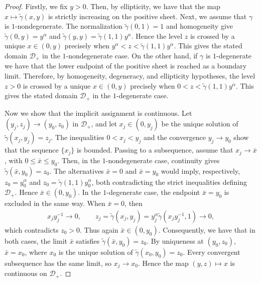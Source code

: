 \documentclass{amsart}
\theoremstyle{plain}
\theoremstyle{mainintrothm}
\theoremstyle{definition}
\begin{document}
\begin{proof}
Firstly, we	fix $y>0$. Then,  by ellipticity, we have that the map $x\mapsto\widetilde\gamma(x,y)$ is strictly increasing on the positive sheet. Next, we assume that $\gamma$ is $1$-nondegenerate.  The normalization
	$\widetilde\gamma(0,1)=1$ and homogeneity give
	$\widetilde\gamma(0,y)=y^\alpha$ and
	$\widetilde\gamma(y,y)=\widetilde\gamma(1,1)y^\alpha$.  Hence the level
	$z$ is crossed by a unique $x\in(0,y)$ precisely when $y^\alpha<z<\widetilde\gamma(1,1)y^\alpha$. This gives the stated domain $\mathcal D_+$ in the $1$-nondegenerate case. On the other hand, if  $\gamma$ is $1$-degenerate we have that  the lower endpoint of the positive sheet is reached as a boundary limit.  Therefore, by homogeneity,
	degeneracy, and ellipticity hypotheses, the level $z>0$ is crossed by a unique $x\in(0,y)$ precisely when $0<z<\widetilde\gamma(1,1)y^\alpha$. This gives the stated domain $\mathcal D_+$ in the $1$-degenerate case.

	\medskip
	
	Now we show that the implicit assignment is continuous.  Let
	$(y_j,z_j)\to(y_0,z_0)$ in $\mathcal D_+$, and let $x_j\in(0,y_j)$ be the
	unique solution of $\widetilde\gamma(x_j,y_j)=z_j$.  The inequalities
	$0<x_j<y_j$ and the convergence $y_j\to y_0$ show that the sequence
	$\{x_j\}$ is bounded.  Passing to a subsequence, assume that $x_j\to\bar x$,
	with $0\leq\bar x\leq y_0$. Then, in the $1$-nondegenerate case, continuity gives
	$\widetilde\gamma(\bar x,y_0)=z_0$.  The alternatives $\bar x=0$ and
	$\bar x=y_0$ would imply, respectively,
	$z_0=y_0^\alpha$ and
	$z_0=\widetilde\gamma(1,1)y_0^\alpha$, both contradicting the strict
	inequalities defining $\mathcal D_+$.  Hence $\bar x\in(0,y_0)$. In the $1$-degenerate case, the endpoint $\bar x=y_0$ is excluded in the
	same way.  When $\bar x=0$, then
	\begin{align*}
		x_jy_j^{-1}\to0,
		\qquad
		z_j
		=
		\widetilde\gamma(x_j,y_j)
		=
		y_j^\alpha
		\widetilde\gamma\left(x_jy_j^{-1},1\right)
		\to0,
	\end{align*}
	which contradicts $z_0>0$.  Thus again $\bar x\in(0,y_0)$. Consequently, we have that in both cases, the limit $\bar x$ satisfies
	$\widetilde\gamma(\bar x,y_0)=z_0$.  By uniqueness at $(y_0,z_0)$,
	$\bar x=x_0$, where $x_0$ is the unique solution of
	$\widetilde\gamma(x_0,y_0)=z_0$.  Every convergent subsequence has the
	same limit, so $x_j\to x_0$.  Hence the map $(y,z)\mapsto x$ is continuous on
	$\mathcal D_+$.

	\medskip


\end{proof}
\end{document}
